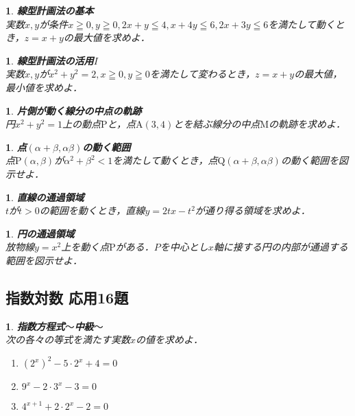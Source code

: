 \documentclass[10pt,
fleqn,
dvipdfmx,
uplatex
]{jsarticle}
\newtheorem{question}[Question]{}
\begin{document}
\begin{question}{\bf\boldmath 線型計画法の基本}\\
実数$x, y$が条件$x\geqq 0, y\geqq 0, 2x+y\leqq 4, x+4y\leqq 6, 2x+3y\leqq 6$を満たして動くとき，$z=x+y$の最大値を求めよ．
\end{question}



\begin{question}{\bf\boldmath 線型計画法の活用$I$}\\
実数$x, y$が$x^2+y^2=2, x\geqq 0, y\geqq 0$を満たして変わるとき，$z=x+y$の最大値，最小値を求めよ．
\end{question}



\begin{question}{\bf\boldmath 片側が動く線分の中点の軌跡}\\
円$x^2+y^2=1$上の動点$\text{P}$と，点$\text{A}\left(3,4\right)$とを結ぶ線分の中点$\text{M}$の軌跡を求めよ．
\end{question}



\begin{question}{\bf\boldmath 点$\left(\alpha +\beta , \alpha \beta \right)$の動く範囲}\\
点$\text{P}\left(\alpha ,\beta \right)$が$\alpha ^2+\beta ^2<1$を満たして動くとき，点$\text{Q}\left(\alpha +\beta ,\alpha \beta \right)$の動く範囲を図示せよ．
\end{question}



\begin{question}{\bf\boldmath 直線の通過領域}\\
$t$が$t>0$の範囲を動くとき，直線$y=2tx-t^2$が通り得る領域を求めよ．
\end{question}



\begin{question}{\bf\boldmath 円の通過領域}\\
放物線$y=x^2$上を動く点$\text{P}$がある．$P$を中心とし$x$軸に接する円の内部が通過する範囲を図示せよ．
\end{question}

\subsection{指数対数 応用16題}



\begin{question}{\bf\boldmath 指数方程式$〜$中級$〜$}\\
次の各々の等式を満たす実数$x$の値を求めよ．
\begin{enumerate}
\item $\left(2^x\right)^2-5\cdot 2^x+4=0$
\item $9^x-2\cdot 3^x-3=0$
\item $4^{x+1}+2\cdot 2^x-2=0$
\end{enumerate}

\end{question}
\end{document}

